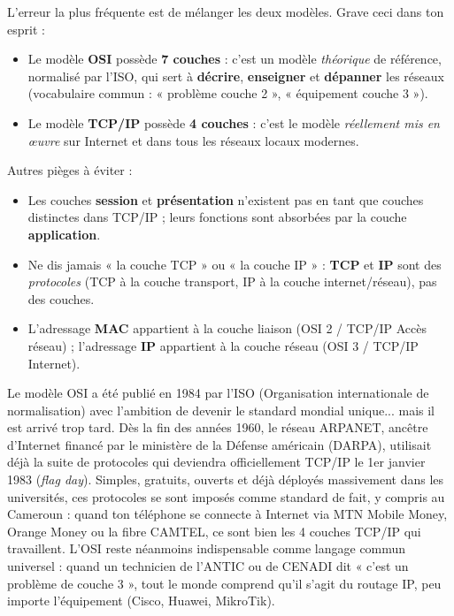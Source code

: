 \documentclass[11pt]{article}
\begin{document}
\begin{attention}
L'erreur la plus fréquente est de mélanger les deux modèles. Grave ceci dans ton esprit :
\begin{itemize}
\item Le modèle \textbf{OSI} possède \textbf{7 couches} : c'est un modèle \emph{théorique} de référence, normalisé par l'ISO, qui sert à \textbf{décrire}, \textbf{enseigner} et \textbf{dépanner} les réseaux (vocabulaire commun : « problème couche 2 », « équipement couche 3 »).
\item Le modèle \textbf{TCP/IP} possède \textbf{4 couches} : c'est le modèle \emph{réellement mis en œuvre} sur Internet et dans tous les réseaux locaux modernes.
\end{itemize}
Autres pièges à éviter :
\begin{itemize}
\item Les couches \textbf{session} et \textbf{présentation} n'existent pas en tant que couches distinctes dans TCP/IP ; leurs fonctions sont absorbées par la couche \textbf{application}.
\item Ne dis jamais « la couche TCP » ou « la couche IP » : \textbf{TCP} et \textbf{IP} sont des \emph{protocoles} (TCP à la couche transport, IP à la couche internet/réseau), pas des couches.
\item L'adressage \textbf{MAC} appartient à la couche liaison (OSI 2 / TCP/IP Accès réseau) ; l'adressage \textbf{IP} appartient à la couche réseau (OSI 3 / TCP/IP Internet).
\end{itemize}
\end{attention}

\begin{savaistu}
Le modèle OSI a été publié en 1984 par l'ISO (Organisation internationale de normalisation) avec l'ambition de devenir le standard mondial unique... mais il est arrivé trop tard. Dès la fin des années 1960, le réseau ARPANET, ancêtre d'Internet financé par le ministère de la Défense américain (DARPA), utilisait déjà la suite de protocoles qui deviendra officiellement TCP/IP le 1er janvier 1983 (\emph{flag day}). Simples, gratuits, ouverts et déjà déployés massivement dans les universités, ces protocoles se sont imposés comme standard de fait, y compris au Cameroun : quand ton téléphone se connecte à Internet via MTN Mobile Money, Orange Money ou la fibre CAMTEL, ce sont bien les 4 couches TCP/IP qui travaillent. L'OSI reste néanmoins indispensable comme langage commun universel : quand un technicien de l'ANTIC ou de CENADI dit « c'est un problème de couche 3 », tout le monde comprend qu'il s'agit du routage IP, peu importe l'équipement (Cisco, Huawei, MikroTik).
\end{savaistu}
\end{document}
